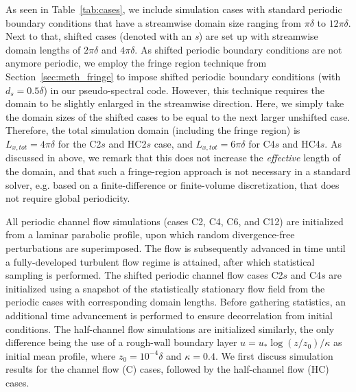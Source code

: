 		As seen in Table~\ref{tab:cases}, we include simulation cases with standard periodic boundary conditions that have a streamwise domain size ranging from $\pi\delta$ to $12\pi\delta$. Next to that, shifted cases (denoted with an \emph{s}) are set up with streamwise domain lengths of $2\pi\delta$ and $4\pi\delta$. As shifted periodic boundary conditions are not anymore periodic, we employ the fringe region technique from Section~\ref{sec:meth_fringe} to impose shifted periodic boundary conditions (with $d_s = 0.5\delta$) in our pseudo-spectral code. 
		However, this technique requires the domain to be slightly enlarged in the streamwise direction. Here, we simply take the domain sizes of the shifted cases to be equal to the next larger unshifted case. Therefore, the total simulation domain (including the fringe region) is $L_{x,tot} = 4\pi\delta$ for the C2$s$ and HC2$s$ case, and $L_{x,tot} = 6\pi\delta$ for C4$s$ and HC4$s$. As discussed in above, we remark that this does not increase the \emph{effective} length of the domain, and that such a fringe-region approach is not necessary in a standard solver, e.g. based on a finite-difference or finite-volume discretization, that does not require global periodicity. 
		
		All periodic channel flow simulations (cases C2, C4, C6, and C12) are initialized from a laminar parabolic profile, upon which random divergence-free perturbations are superimposed. The flow is subsequently advanced in time until a fully-developed turbulent flow regime is attained, after which statistical sampling is performed. The shifted periodic channel flow cases C2$s$ and C4$s$ are initialized using a snapshot of the statistically stationary flow field from the periodic cases with corresponding domain lengths. Before gathering statistics, an additional time advancement is performed to ensure decorrelation from initial conditions. The half-channel flow simulations are initialized similarly, the only difference being the use of a rough-wall boundary layer $u = u_* \log (z/z_0)/\kappa$ as initial mean profile, where $z_0 = 10^{-4}\delta$ and $\kappa = 0.4$. We first discuss simulation results for the channel flow (C) cases, followed by the half-channel flow (HC) cases.
		
